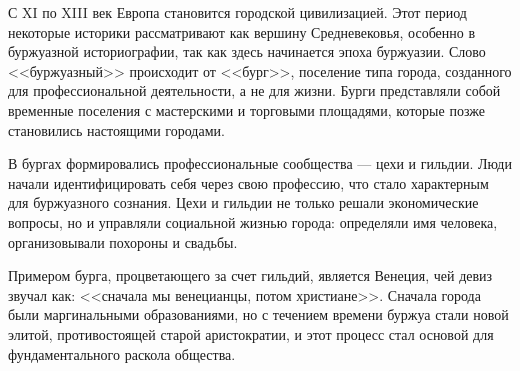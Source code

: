 
С XI по XIII век Европа становится городской цивилизацией. Этот период некоторые историки рассматривают как вершину Средневековья, особенно в буржуазной историографии, так как здесь начинается эпоха буржуазии. Слово <<буржуазный>> происходит от <<бург>>, поселение типа города, созданного для профессиональной деятельности, а не для жизни. Бурги представляли собой временные поселения с мастерскими и торговыми площадями, которые позже становились настоящими городами.

В бургах формировались профессиональные сообщества --- цехи и гильдии. Люди начали идентифицировать себя через свою профессию, что стало характерным для буржуазного сознания. Цехи и гильдии не только решали экономические вопросы, но и управляли социальной жизнью города: определяли имя человека, организовывали похороны и свадьбы.

Примером бурга, процветающего за счет гильдий, является Венеция, чей девиз звучал как: <<сначала мы венецианцы, потом христиане>>. Сначала города были маргинальными образованиями, но с течением времени буржуа стали новой элитой, противостоящей старой аристократии, и этот процесс стал основой для фундаментального раскола общества.


